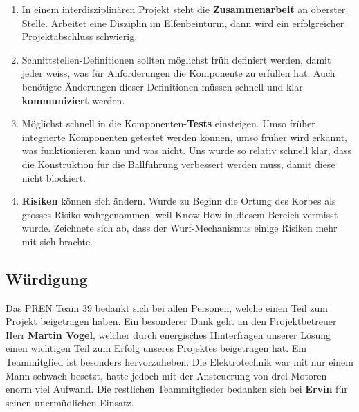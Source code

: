 \begin{enumerate}
	\item  In einem interdisziplinären Projekt steht die \textbf{Zusammenarbeit} an oberster Stelle. Arbeitet eine Disziplin im Elfenbeinturm, dann wird ein erfolgreicher Projektabschluss schwierig.
	\item Schnittstellen-Definitionen sollten möglichst früh definiert werden, damit jeder weiss, was für Anforderungen die Komponente zu erfüllen hat. Auch benötigte Änderungen dieser Definitionen müssen schnell und klar \textbf{kommuniziert} werden.
	\item Möglichst schnell in die Komponenten-\textbf{Tests} einsteigen. Umso früher integrierte Komponenten getestet werden können, umso früher wird erkannt, was funktionieren kann und was nicht. Uns wurde so relativ schnell klar, dass die Konstruktion für die Ballführung verbessert werden muss, damit diese nicht blockiert.
	\item \textbf{Risiken} können sich ändern. Wurde zu Beginn die Ortung des Korbes als grosses Risiko wahrgenommen, weil Know-How in diesem Bereich vermisst wurde. Zeichnete sich ab, dass der Wurf-Mechanismus einige Risiken mehr mit sich brachte.
\end{enumerate}

\subsection{Würdigung}
Das PREN Team 39 bedankt sich bei allen Personen, welche einen Teil zum Projekt beigetragen haben. Ein besonderer Dank geht an den Projektbetreuer Herr \textbf{Martin Vogel}, welcher durch energisches Hinterfragen unserer Lösung einen wichtigen Teil zum Erfolg unseres Projektes beigetragen hat. Ein Teammitglied ist besonders hervorzuheben. Die Elektrotechnik war mit nur einem Mann schwach besetzt, hatte jedoch mit der Ansteuerung von drei Motoren enorm viel Aufwand. Die restlichen Teammitglieder bedanken sich bei \textbf{Ervin} für seinen unermüdlichen Einsatz.